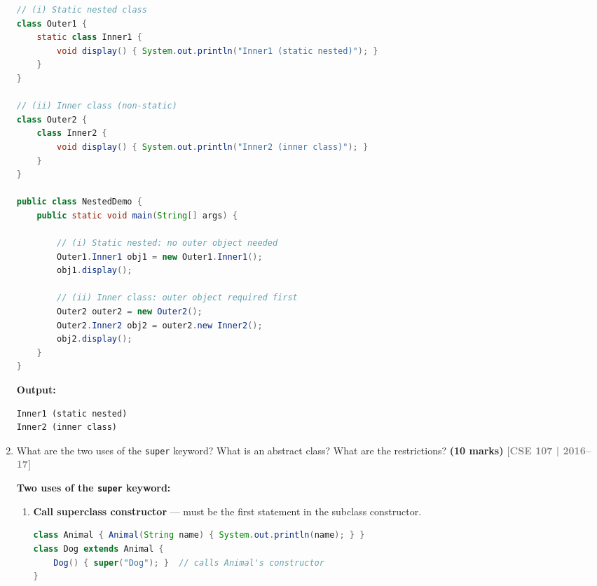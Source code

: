 \documentclass[12pt,a3paper]{article}
\newcommand{\yr}[1]{\hfill\textcolor{gray}{\small\textbf{[#1]}}}
\newcommand{\mk}[1]{\textcolor{orange!70!black}{\small\textbf{(#1 marks)}}}
\begin{document}
\begin{enumerate}
\begin{tcolorbox}[enhanced,breakable,ansbox,
  colback=cD!4,colframe=cD,boxrule=0.8pt,arc=5pt,
  title={\textbf{Answer --- Static Nested \& Inner Class Object Creation}},
  fonttitle=\bfseries\color{white},colbacktitle=cD]

\begin{lstlisting}[language=Java]
// (i) Static nested class
class Outer1 {
    static class Inner1 {
        void display() { System.out.println("Inner1 (static nested)"); }
    }
}

// (ii) Inner class (non-static)
class Outer2 {
    class Inner2 {
        void display() { System.out.println("Inner2 (inner class)"); }
    }
}

public class NestedDemo {
    public static void main(String[] args) {

        // (i) Static nested: no outer object needed
        Outer1.Inner1 obj1 = new Outer1.Inner1();
        obj1.display();

        // (ii) Inner class: outer object required first
        Outer2 outer2 = new Outer2();
        Outer2.Inner2 obj2 = outer2.new Inner2();
        obj2.display();
    }
}
\end{lstlisting}

\textbf{Output:}
\begin{lstlisting}
Inner1 (static nested)
Inner2 (inner class)
\end{lstlisting}

\end{tcolorbox}

\item What are the two uses of the \texttt{super} keyword? What is an abstract class? What are the restrictions? \mk{10}
\yr{CSE 107 | 2016--17}

\begin{tcolorbox}[enhanced,breakable,ansbox,
  colback=cD!4,colframe=cD,boxrule=0.8pt,arc=5pt,
  title={\textbf{Answer --- Two Uses of \texttt{super} \& Abstract Class}},
  fonttitle=\bfseries\color{white},colbacktitle=cD]

\textbf{Two uses of the \texttt{super} keyword:}

\begin{enumerate}[label=\textbf{\arabic*.}]
  \item \textbf{Call superclass constructor} --- must be the first
    statement in the subclass constructor.
\begin{lstlisting}[language=Java]
class Animal { Animal(String name) { System.out.println(name); } }
class Dog extends Animal {
    Dog() { super("Dog"); }  // calls Animal's constructor
}
\end{lstlisting}


\end{enumerate}
\end{tcolorbox}
\end{enumerate}
\end{document}
